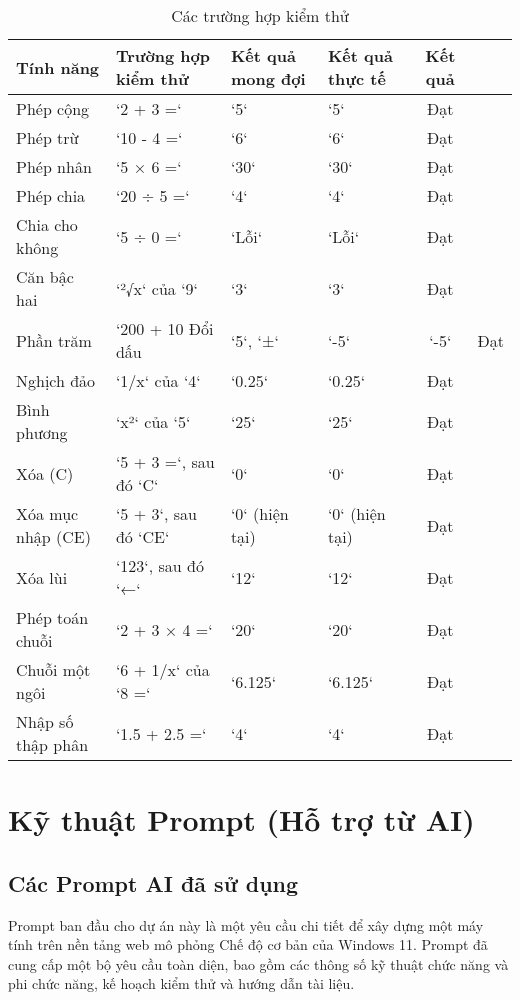 \documentclass{article}
\begin{document}
\begin{table}[h!]
\centering
\begin{tabularx}{\textwidth}{|l|X|l|l|c|}
\hline
\textbf{Tính năng} & \textbf{Trường hợp kiểm thử} & \textbf{Kết quả mong đợi} & \textbf{Kết quả thực tế} & \textbf{Kết quả} \\
\hline
Phép cộng & `2 + 3 =` & `5` & `5` & Đạt \\
\hline
Phép trừ & `10 - 4 =` & `6` & `6` & Đạt \\
\hline
Phép nhân & `5 × 6 =` & `30` & `30` & Đạt \\
\hline
Phép chia & `20 ÷ 5 =` & `4` & `4` & Đạt \\
\hline
Chia cho không & `5 ÷ 0 =` & `Lỗi` & `Lỗi` & Đạt \\
\hline
Căn bậc hai & `²√x` của `9` & `3` & `3` & Đạt \\
\hline
Phần trăm & `200 + 10 %
\hline
Đổi dấu & `5`, `±` & `-5` & `-5` & Đạt \\
\hline
Nghịch đảo & `1/x` của `4` & `0.25` & `0.25` & Đạt \\
\hline
Bình phương & `x²` của `5` & `25` & `25` & Đạt \\
\hline
Xóa (C) & `5 + 3 =`, sau đó `C` & `0` & `0` & Đạt \\
\hline
Xóa mục nhập (CE) & `5 + 3`, sau đó `CE` & `0` (hiện tại) & `0` (hiện tại) & Đạt \\
\hline
Xóa lùi & `123`, sau đó `←` & `12` & `12` & Đạt \\
\hline
Phép toán chuỗi & `2 + 3 × 4 =` & `20` & `20` & Đạt \\
\hline
Chuỗi một ngôi & `6 + 1/x` của `8 =` & `6.125` & `6.125` & Đạt \\
\hline
Nhập số thập phân & `1.5 + 2.5 =` & `4` & `4` & Đạt \\
\hline
\end{tabularx}
\caption{Các trường hợp kiểm thử}
\end{table}

\section{Kỹ thuật Prompt (Hỗ trợ từ AI)}

\subsection{Các Prompt AI đã sử dụng}
Prompt ban đầu cho dự án này là một yêu cầu chi tiết để xây dựng một máy tính trên nền tảng web mô phỏng Chế độ cơ bản của Windows 11. Prompt đã cung cấp một bộ yêu cầu toàn diện, bao gồm các thông số kỹ thuật chức năng và phi chức năng, kế hoạch kiểm thử và hướng dẫn tài liệu.
\end{document}
